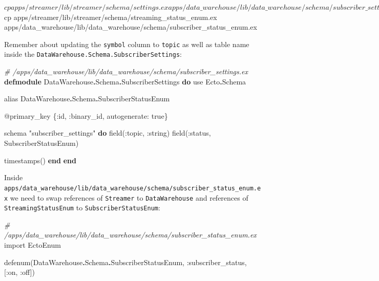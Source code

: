 \documentclass[
  oneside]{book}
\newenvironment{Shaded}{\begin{snugshade}}{\end{snugshade}}
\newcommand{\CommentTok}[1]{\textcolor[rgb]{0.56,0.35,0.01}{\textit{#1}}}
\newcommand{\ConstantTok}[1]{\textcolor[rgb]{0.00,0.00,0.00}{#1}}
\newcommand{\ExtensionTok}[1]{#1}
\newcommand{\ImportTok}[1]{#1}
\newcommand{\KeywordTok}[1]{\textcolor[rgb]{0.13,0.29,0.53}{\textbf{#1}}}
\newcommand{\NormalTok}[1]{#1}
\newcommand{\OperatorTok}[1]{\textcolor[rgb]{0.81,0.36,0.00}{\textbf{#1}}}
\newcommand{\OtherTok}[1]{\textcolor[rgb]{0.56,0.35,0.01}{#1}}
\newcommand{\StringTok}[1]{\textcolor[rgb]{0.31,0.60,0.02}{#1}}
\newcommand{\VariableTok}[1]{\textcolor[rgb]{0.00,0.00,0.00}{#1}}
\begin{document}
\begin{Shaded}
\begin{Highlighting}[]
\ExtensionTok{$}\NormalTok{ cp apps/streamer/lib/streamer/schema/settings.ex apps/data\_warehouse/lib/data\_warehouse/schema/subscriber\_settings.ex}
\ExtensionTok{$}\NormalTok{ cp apps/streamer/lib/streamer/schema/streaming\_status\_enum.ex apps/data\_warehouse/lib/data\_warehouse/schema/subscriber\_status\_enum.ex}
\end{Highlighting}
\end{Shaded}

Remember about updating the \texttt{symbol} column to \texttt{topic} as well as table name inside the \texttt{DataWarehouse.Schema.SubscriberSettings}:

\begin{Shaded}
\begin{Highlighting}[]
\CommentTok{\# /apps/data\_warehouse/lib/data\_warehouse/schema/subscriber\_settings.ex}
\KeywordTok{defmodule} \ConstantTok{DataWarehouse}\OperatorTok{.}\ConstantTok{Schema}\OperatorTok{.}\ConstantTok{SubscriberSettings} \KeywordTok{do}
  \ImportTok{use} \ConstantTok{Ecto}\OperatorTok{.}\ConstantTok{Schema}

  \ImportTok{alias} \ConstantTok{DataWarehouse}\OperatorTok{.}\ConstantTok{Schema}\OperatorTok{.}\ConstantTok{SubscriberStatusEnum}

  \OtherTok{@primary\_key}\NormalTok{ \{}\VariableTok{:id}\NormalTok{, }\VariableTok{:binary\_id}\NormalTok{, }\VariableTok{autogenerate:} \ConstantTok{true}\NormalTok{\}}

\NormalTok{  schema }\StringTok{"subscriber\_settings"} \KeywordTok{do}
\NormalTok{    field(}\VariableTok{:topic}\NormalTok{, }\VariableTok{:string}\NormalTok{)}
\NormalTok{    field(}\VariableTok{:status}\NormalTok{, }\ConstantTok{SubscriberStatusEnum}\NormalTok{)}

\NormalTok{    timestamps()}
  \KeywordTok{end}
\KeywordTok{end}
\end{Highlighting}
\end{Shaded}

Inside \texttt{apps/data\_warehouse/lib/data\_warehouse/schema/subscriber\_status\_enum.ex} we need to swap references of \texttt{Streamer} to \texttt{DataWarehouse} and references of \texttt{StreamingStatusEnum} to \texttt{SubscriberStatusEnum}:

\begin{Shaded}
\begin{Highlighting}[]
\CommentTok{\# /apps/data\_warehouse/lib/data\_warehouse/schema/subscriber\_status\_enum.ex}
\ImportTok{import} \ConstantTok{EctoEnum}

\NormalTok{defenum(}\ConstantTok{DataWarehouse}\OperatorTok{.}\ConstantTok{Schema}\OperatorTok{.}\ConstantTok{SubscriberStatusEnum}\NormalTok{, }\VariableTok{:subscriber\_status}\NormalTok{, [}\VariableTok{:on}\NormalTok{, }\VariableTok{:off}\NormalTok{])}
\end{Highlighting}
\end{Shaded}
\end{document}
